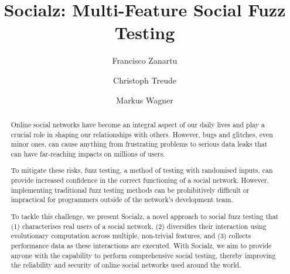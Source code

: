 \documentclass[dvipsnames,format=sigconf,anonymous=False,review=false, balance=false]{acmart}
\begin{document}
\title{Socialz: Multi-Feature Social Fuzz Testing}

\author{Francisco Zanartu}

\author{Christoph Treude}

\author{Markus Wagner}



\begin{abstract}

Online social networks have become an integral aspect of our daily lives and play a crucial role in shaping our relationships with others. However, bugs and glitches, even minor ones, can cause anything from frustrating problems to serious data leaks that can have far-reaching impacts on millions of users.

To mitigate these risks, fuzz testing, a method of testing with randomised inputs, can provide increased confidence in the correct functioning of a social network. However, implementing traditional fuzz testing methods can be prohibitively difficult or impractical for programmers outside of the network's development team. 

To tackle this challenge, we present Socialz, a novel approach to social fuzz testing that 
(1) characterises real users of a social network, 
(2) diversifies their interaction using evolutionary computation across multiple, non-trivial features, and 
(3) collects performance data as these interactions are executed. 
With Socialz, we aim to provide anyone with the capability to perform comprehensive social testing, thereby improving the reliability and security of online social networks used around the world.

\end{abstract}


\maketitle

\sloppy
\end{document}
